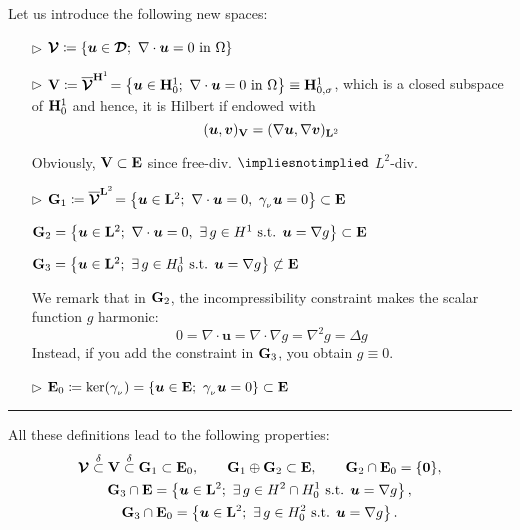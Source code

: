 Let us introduce the following new spaces:
\begin{itemize}
\item[$\triangleright$] $\bm\Vc \coloneq \left\{ \bm u\in\bm\Dc;\ \nabla\cdot\bm u=0 \text{ in }\Omega \right\}$

\item[$\triangleright$] $\mathbf{V}\coloneq \overline{\bm{\mathcal{V}}}^{\mathbf{H}^1} \!= \left\{ \bm u\in\mathbf{H}_0^1;\ \nabla\cdot\bm u=0\text{ in }\Omega\right\}\equiv\mathbf{H}^1_{0,\sigma}$, which is a closed subspace of $\mathbf{H}^1_0$ and hence, it is Hilbert if endowed with
\begin{equation*}
(\bm u,\bm v)_{\mathbf{V}}=(\nabla \bm u,\nabla \bm v)_{\mathbf{L}^2} 
\end{equation*}

Obviously, $\mathbf{V}\subset\mathbf{E}$ since free-div. $\impliesnotimplied$ $L^2$-div.

\item[$\triangleright$] $\mathbf{G}_1\coloneq \overline{\bm{\mathcal{V}}}^{\mathbf{L}^2} \!= \left\{ \bm u\in\mathbf{L}^2;\ \nabla\cdot\bm u=0,\ \gamma_{_\nu} \bm u=0 \right\}\subset\mathbf{E}$ 

$\mathbf{G}_2=\left\{ \bm u\in\mathbf{L}^2;\ \nabla\cdot\bm u=0,\ \exists\,g\in H^1\text{ s.t. }\bm u=\nabla g \right\}\subset\mathbf{E}$ 

$\mathbf{G}_3=\left\{\bm u\in\mathbf{L}^2;\ \exists\,g\in H^1_0\text{ s.t. }\bm u=\nabla g \right\}\centernot\subset\Ev$

We remark that in $\mathbf{G}_2$, the incompressibility constraint makes the scalar function $g$ harmonic:
\begin{equation*}
0=\nabla\cdot\bm u=\nabla\cdot\nabla g=\nabla^2 g=\Delta g
\end{equation*}
Instead, if you add the constraint in $\mathbf{G}_3$, you obtain $g\equiv 0$.

\item[$\triangleright$] $\mathbf{E}_0\coloneq \ker(\gamma_{_\nu})=\left\{ \bm u\in\mathbf{E};\ \gamma_{_\nu} \bm u=0 \right\}\subset \mathbf{E} $
\end{itemize}
\vspace{-0.5em}
\rule{0.495\textwidth}{0.2pt}\smallskip

All these definitions lead to the following properties:
\vspace{-0.5em}
\begin{gather*}
\bm{\mathcal{V}} \overset{\delta}{\subset} \mathbf{V} \overset{\delta}{\subset} \mathbf{G}_1\subset\mathbf{E}_0, \qquad \mathbf{G}_1\oplus\mathbf{G}_2\subset\mathbf{E}, \qquad \mathbf{G}_2\cap \mathbf{E}_0=\{\bm 0\},\\
\mathbf{G}_3 \cap \mathbf{E} = \left\{ \bm u \in \mathbf{L}^2;\ \exists\,g\in H^2\cap H^1_0 \text{ s.t. }\bm u=\nabla g \right\}, \\
\mathbf{G}_3 \cap \mathbf{E}_0 = \left\{ \bm u \in \mathbf{L}^2;\ \exists\,g\in H^2_0 \text{ s.t. }\bm u=\nabla g \right\}.
\end{gather*}

